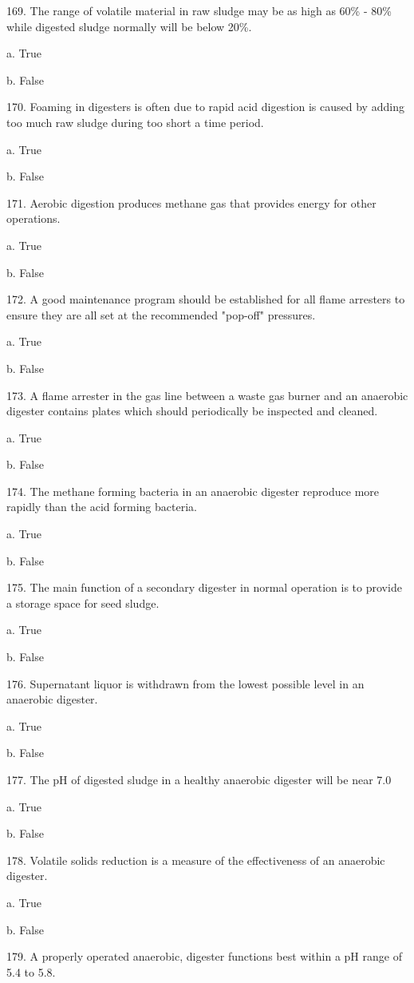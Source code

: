\documentclass{article}
\begin{document}
169. The range of volatile material in raw sludge may be as high as 60\% - 80\% while digested sludge normally will be below 20\%. 

a. True 

b. False 


170. Foaming in digesters is often due to rapid acid digestion is caused by adding too much raw sludge during too short a time period. 

a. True 

b. False 


171. Aerobic digestion produces methane gas that provides energy for other operations. 

a. True 

b. False 


172. A good maintenance program should be established for all flame arresters to ensure they are all set at the recommended "pop-off" pressures. 

a. True 

b. False 


173. A flame arrester in the gas line between a waste gas burner and an anaerobic digester contains plates which should periodically be inspected and cleaned. 

a. True 

b. False 


174. The methane forming bacteria in an anaerobic digester reproduce more rapidly than the acid forming bacteria. 

a. True 

b. False 


175. The main function of a secondary digester in normal operation is to provide a storage space for seed sludge. 

a. True 

b. False 


176. Supernatant liquor is withdrawn from the lowest possible level in an anaerobic digester. 

a. True 

b. False 


177. The pH of digested sludge in a healthy anaerobic digester will be near 7.0 

a. True 

b. False 


178. Volatile solids reduction is a measure of the effectiveness of an anaerobic digester. 

a. True 

b. False 


179. A properly operated anaerobic, digester functions best within a pH range of 5.4 to 5.8. 
\end{document}
